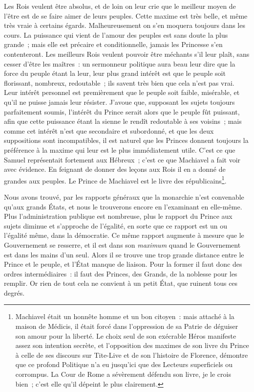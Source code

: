 \documentclass[french,twoside]{book} %
\begin{document}
Les Rois veulent être absolus, et de loin on leur crie que le meilleur moyen de l’être est de se faire aimer de leurs peuples. Cette maxime est très belle, et même très vraie à certains égards. Malheureusement on s’en moquera toujours dans les cours. La puissance qui vient de l’amour des peuples est sans doute la plus grande ; mais elle est précaire et conditionnelle, jamais les Princesse s’en contenteront. Les meilleurs Rois veulent pouvoir être méchants s’il leur plaît, sans cesser d’être les maîtres : un sermonneur politique aura beau leur dire que la force du peuple étant la leur, leur plus grand intérêt est que le peuple soit florissant, nombreux, redoutable ; ils savent très bien que cela n’est pas vrai. Leur intérêt personnel est premièrement que le peuple soit faible, misérable, et qu’il ne puisse jamais leur résister. J’avoue que, supposant les sujets toujours parfaitement soumis, l’intérêt du Prince serait alors que le peuple fût puissant, afin que cette puissance étant la sienne le rendît redoutable à ses voisins ; mais comme cet intérêt n’est que secondaire et subordonné, et que les deux suppositions sont incompatibles, il est naturel que les Princes donnent toujours la préférence à la maxime qui leur est le plus immédiatement utile. C’est ce que Samuel représentait fortement aux Hébreux ; c’est ce que Machiavel a fait voir avec évidence. En feignant de donner des leçons aux Rois il en a donné de grandes aux peuples. Le Prince de Machiavel est le livre des républicains\footnote{Machiavel était un honnête homme et un bon citoyen : mais attaché à la maison de Médicis, il était forcé dans l’oppression de sa Patrie de déguiser son amour pour la liberté. Le choix seul de son exécrable Héros manifeste assez son intention secrète, et l’opposition des maximes de son livre du Prince à celle de ses discours sur Tite-Live et de son l’histoire de Florence, démontre que ce profond Politique n’a eu jusqu’ici que des Lecteurs superficiels ou corrompus. La Cour de Rome a sévèrement défendu son livre, je le crois bien ; c’est elle qu’il dépeint le plus clairement.}.\par
Nous avons trouvé, par les rapports généraux que la monarchie n’est convenable qu’aux grands États, et nous le trouverons encore en l’examinant en elle-même. Plus l’administration publique est nombreuse, plus le rapport du Prince aux sujets diminue et s’approche de l’égalité, en sorte que ce rapport est un ou l’égalité même, dans la démocratie. Ce même rapport augmente à mesure que le Gouvernement se resserre, et il est dans son {\itshape maximum} quand le Gouvernement est dans les mains d’un seul. Alors il se trouve une trop grande distance entre le Prince et le peuple, et l’État manque de liaison. Pour la former il faut donc des ordres intermédiaires : il faut des Princes, des Grands, de la noblesse pour les remplir. Or rien de tout cela ne convient à un petit État, que ruinent tous ces degrés.\par
\end{document}
